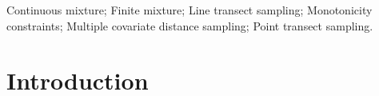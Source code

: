 \documentclass[useAMS,referee, usegraphicx]{biom}
\begin{document}
%

\begin{keywords}
Continuous mixture; Finite mixture; Line transect sampling; Monotonicity constraints; Multiple covariate distance sampling; Point transect sampling.
\end{keywords}


\maketitle



%

\section{Introduction}
\label{s:intro}
\end{document}
